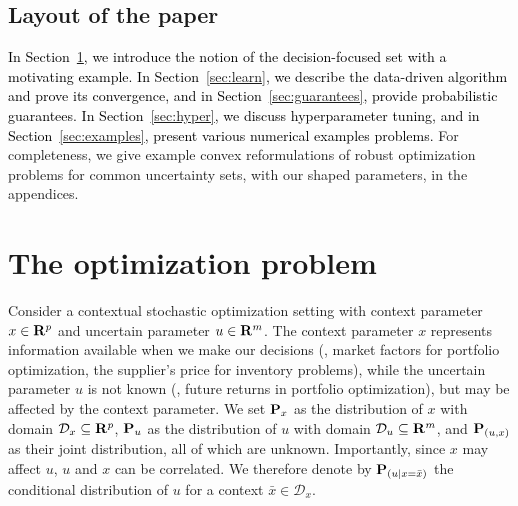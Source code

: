 \documentclass[11pt]{article}
\newcommand{\bsnote}[1]{\noindent\textcolor{red}{\texttt{Bartolomeo: #1}}}
\newcommand{\RC}[1]{\textcolor{black}{#1}}
\begin{document}
\subsection{Layout of the paper}%
\RC{In Section~\ref{sec:intro}, we introduce the notion of the decision-focused set with a motivating example. In Section~\ref{sec:learn}, we describe the data-driven algorithm and prove its convergence, and in Section~\ref{sec:guarantees}, provide probabilistic guarantees.
In Section~\ref{sec:hyper}, we discuss hyperparameter tuning, and in Section~\ref{sec:examples}, present various numerical examples problems.}
For completeness, we give example convex reformulations of robust optimization problems for common uncertainty sets, with our shaped parameters, in the appendices.

\setlength{\parskip}{0pt plus 1pt}
\section{The optimization problem}
\label{sec:intro}
Consider a contextual stochastic optimization setting with context parameter $x \in {\mathbf R}^p$ and uncertain parameter $u \in {\mathbf R}^m$. 
The context parameter $x$ represents information available when we make our decisions (\eg, market factors for portfolio optimization, the supplier's price for inventory problems), while the uncertain parameter $u$ is not known (\eg, future returns in portfolio optimization), but may be affected by the context parameter.
We set ${\mathbf P}_x$ as the distribution of $x$ with domain $\mathcal{D}_x \subseteq {\mathbf R}^p$, ${\mathbf P}_u$ as the  distribution of $u$ with domain $\mathcal{D}_u \subseteq {\mathbf R}^m$, and ${\mathbf P}_{(u, x)}$ as their joint distribution, all of which are unknown.
Importantly, since $x$ may affect $u$, $u$ and $x$ can be correlated. We therefore denote by ${\mathbf P}_{(u|x = \bar{x})}$ the conditional distribution of $u$ for a context $\bar{x} \in \mathcal{D}_x$.
\end{document}
